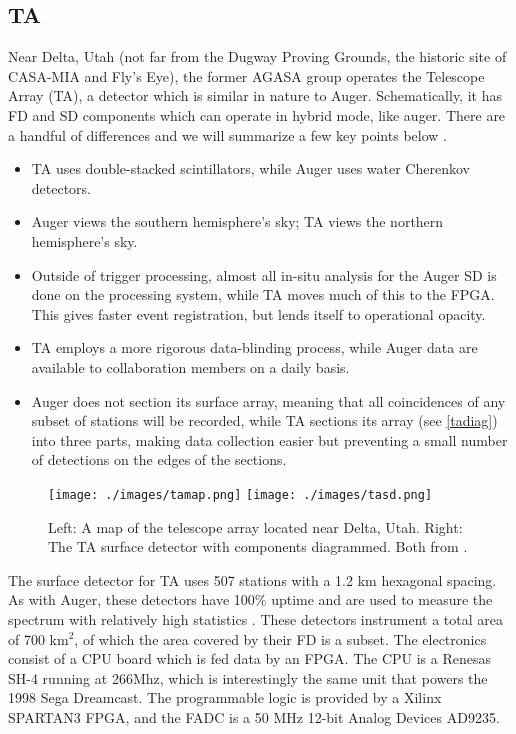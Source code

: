 \subsection{TA}
\label{ta}
Near Delta, Utah (not far from the Dugway Proving Grounds, the historic site of CASA-MIA and Fly's Eye), the former AGASA group operates the Telescope Array (TA), a detector which is similar in nature to Auger. Schematically, it has FD and SD components which can operate in hybrid mode, like auger. There are a handful of differences and we will summarize a few key points below \cite{tale}.
\begin{itemize}
\item TA uses double-stacked scintillators, while Auger uses water Cherenkov detectors.
\item Auger views the southern hemisphere's sky; TA views the northern hemisphere's sky.
\item Outside of trigger processing, almost all in-situ analysis for the Auger SD is done on the processing system, while TA moves much of this to the FPGA. This gives faster event registration, but lends itself to operational opacity.
\item TA employs a more rigorous data-blinding process, while Auger data are available to collaboration members on a daily basis.
\item Auger does not section its surface array, meaning that all coincidences of any subset of stations will be recorded, while TA sections its array (see \autoref{tadiag}) into three parts, making data collection easier but preventing a small number of detections on the edges of the sections.
\end{itemize}
\begin{figure}[h!]
\begin{center}
\texttt{[image: ./images/tamap.png]}
\texttt{[image: ./images/tasd.png]}
\caption[TA Map and Surface Detector]{Left: A map of the telescope array located near Delta, Utah. Right: The TA surface detector with components diagrammed. Both from \cite{tasd}.}
\label{tadiag}
\end{center}
\end{figure}
The surface detector for TA uses 507 stations with a 1.2 km hexagonal spacing. As with Auger, these detectors have 100\% uptime and are used to measure the spectrum with relatively high statistics \cite{tasd}. These detectors instrument a total area of 700 km$^2$, of which the area covered by their FD is a subset. The electronics consist of a CPU board which is fed data by an FPGA. The CPU is a Renesas SH-4 running at 266Mhz, which is interestingly the same unit that powers the 1998 Sega Dreamcast. The programmable logic is provided by a Xilinx SPARTAN3 FPGA, and the FADC is a 50 MHz 12-bit Analog Devices AD9235.


